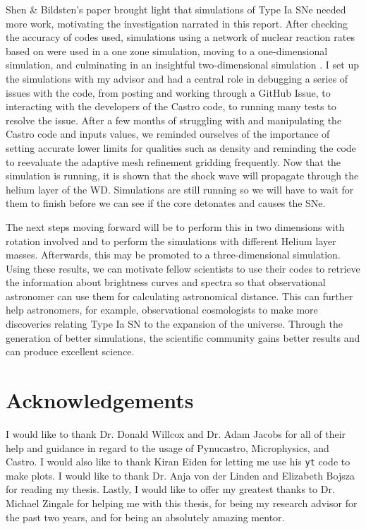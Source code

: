 \documentclass[preprint]{aastex62}
\begin{document}
  
  Shen \& Bildsten's paper brought light that simulations of Type Ia SNe needed more work, motivating the investigation narrated in this report. After checking the accuracy of codes used, simulations using a network of nuclear reaction rates based on \citet{shenNbildsten} were used in a one zone simulation, moving to a one-dimensional simulation, and culminating in an insightful two-dimensional simulation \citep{shenNbildsten}. I set up the simulations with my advisor and had a central role in debugging a series of issues with the code, from posting and working through a GitHub Issue, to interacting with the developers of the Castro code, to running many tests to resolve the issue. After a few months of struggling with and manipulating the Castro code and inputs values, we reminded ourselves of the importance of setting accurate lower limits for qualities such as density and reminding the code to reevaluate the adaptive mesh refinement gridding frequently. Now that the simulation is running, it is shown that the shock wave will propagate through the helium layer of the WD. Simulations are still running so we will have to wait for them to finish before we can see if the core detonates and causes the SNe. 
  
  The next steps moving forward will be to perform this in two dimensions with rotation involved and to perform the simulations with different Helium layer masses. Afterwards, this may be promoted to a three-dimensional simulation. Using these results, we can motivate fellow scientists to use their codes to retrieve the information about brightness curves and spectra so that observational astronomer can use them for calculating astronomical distance. This can further help astronomers, for example, observational cosmologists to make more discoveries relating Type Ia SN to the expansion of the universe. Through the generation of better simulations, the scientific community gains better results and can produce excellent science. 

  
\section{Acknowledgements}

I would like to thank Dr. Donald Willcox and Dr. Adam Jacobs for all of their help and guidance in regard to the usage of Pynucastro, Microphysics, and Castro. I would also like to thank Kiran Eiden for letting me use his {\tt yt} code to make plots. I would like to thank Dr. Anja von der Linden and Elizabeth Bojsza for reading my thesis. Lastly, I would like to offer my greatest thanks to Dr. Michael Zingale for helping me with this thesis, for being my research advisor for the past two years, and for being an absolutely amazing mentor. 


\end{document}
